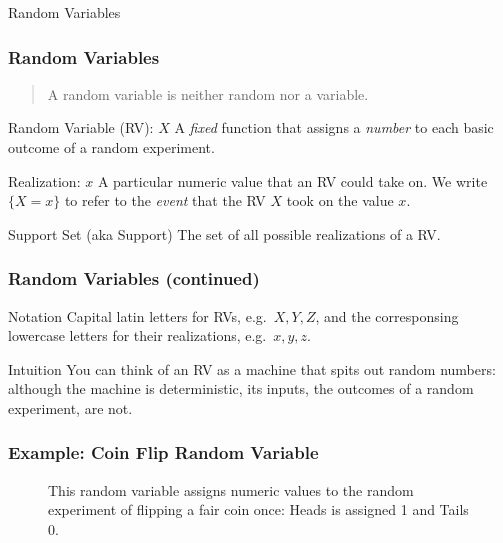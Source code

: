 \begin{frame}
  \begin{center}
  \Huge Random Variables
  \end{center}
\end{frame}
\def\RVraw{(-2.5,0) circle [radius=1.7]
	(-2.5,0) circle [radius=1.7]
	(2.5,0) circle [radius=1.7]
	node [above left] at (-3.75,1.25) {$S$}
	node [above right] at (3.75,1.25) {$\mathbb{R}$}
}
\begin{frame}
  \frametitle{Random Variables}
  \begin{quote}
    A random variable is neither random nor a variable.
  \end{quote}
\begin{block}{Random Variable (RV): $X$}
  A \emph{fixed} function that assigns a \emph{number} to each basic outcome of a random experiment.
\end{block}
 
\begin{block}{Realization: $x$}
A particular numeric value that an RV could take on. We write $\{X = x\}$ to refer to the \emph{event} that the RV $X$ took on the value $x$.  
\end{block}
 
\begin{block}{Support Set (aka Support)}
The set of all possible realizations of a RV.
\end{block}
 
\end{frame}
\begin{frame}
  \frametitle{Random Variables (continued)}
\begin{block}{Notation}
Capital latin letters for RVs, e.g.\ $X,Y,Z$, and the corresponsing lowercase letters for their realizations, e.g.\ $x,y,z$.
\end{block}

\begin{block}{Intuition}
  You can think of an RV as a machine that spits out random numbers: although the machine is deterministic, its inputs, the outcomes of a random experiment, are not.
\end{block}
\end{frame}
\begin{frame}
\frametitle{Example: Coin Flip Random Variable}

\begin{figure}
\centering
{}
\caption{This random variable assigns numeric values to the random experiment of flipping a fair coin once: Heads is assigned 1 and Tails 0.}
\end{figure}
\end{frame}
